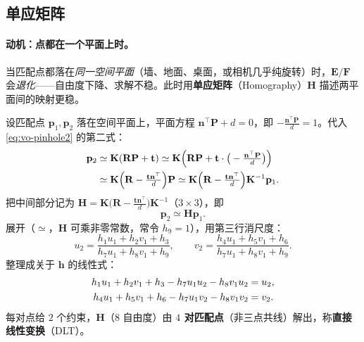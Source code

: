 \subsection{单应矩阵}
\label{sec:vo-homography}

\paragraph{动机：点都在一个平面上时。}当匹配点都落在\emph{同一空间平面}（墙、地面、桌面，或相机几乎纯旋转）时，$\mathbf{E}/\mathbf{F}$ 会\emph{退化}——自由度下降、求解不稳。此时用\textbf{单应矩阵}（Homography）$\mathbf{H}$ 描述两平面间的映射更稳\cite{gaoxiang2019slam14}。

\begin{derivation}
\label{thm:vo-H}
设匹配点 $\mathbf{p}_1,\mathbf{p}_2$ 落在空间平面上，平面方程 $\mathbf{n}^\top\mathbf{P}+d=0$，即 $-\tfrac{\mathbf{n}^\top\mathbf{P}}{d}=1$。代入 \cref{eq:vo-pinhole2} 的第二式：
\begin{align}
  \mathbf{p}_2&\simeq\mathbf{K}(\mathbf{R}\mathbf{P}+\mathbf{t})
   \simeq\mathbf{K}\Big(\mathbf{R}\mathbf{P}+\mathbf{t}\cdot\big(-\tfrac{\mathbf{n}^\top\mathbf{P}}{d}\big)\Big)\notag\\
  &\simeq\mathbf{K}\Big(\mathbf{R}-\tfrac{\mathbf{t}\mathbf{n}^\top}{d}\Big)\mathbf{P}
   \simeq\mathbf{K}\Big(\mathbf{R}-\tfrac{\mathbf{t}\mathbf{n}^\top}{d}\Big)\mathbf{K}^{-1}\mathbf{p}_1.
  \label{eq:vo-H-derive}
\end{align}
把中间部分记为 $\mathbf{H}=\mathbf{K}\big(\mathbf{R}-\tfrac{\mathbf{t}\mathbf{n}^\top}{d}\big)\mathbf{K}^{-1}$（$3\times3$），即
\begin{equation}
  \mathbf{p}_2\simeq\mathbf{H}\mathbf{p}_1.
  \label{eq:vo-H}
\end{equation}
展开（$\simeq$，$\mathbf{H}$ 可乘非零常数，常令 $h_9=1$），用第三行消尺度：
\begin{equation}
  u_2=\frac{h_1u_1+h_2v_1+h_3}{h_7u_1+h_8v_1+h_9},\qquad
  v_2=\frac{h_4u_1+h_5v_1+h_6}{h_7u_1+h_8v_1+h_9}.
  \label{eq:vo-H-uv}
\end{equation}
整理成关于 $\mathbf{h}$ 的线性式：
\begin{align}
  h_1u_1+h_2v_1+h_3-h_7u_1u_2-h_8v_1u_2&=u_2,\notag\\
  h_4u_1+h_5v_1+h_6-h_7u_1v_2-h_8v_1v_2&=v_2.
  \label{eq:vo-H-lin}
\end{align}
每对点给 $2$ 个约束，$\mathbf{H}$（$8$ 自由度）由 \textbf{$4$ 对匹配点}（非三点共线）解出，称\textbf{直接线性变换}（DLT）。
\end{derivation}


